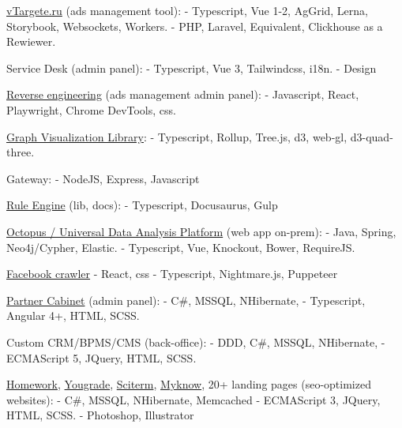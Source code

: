 \documentclass{yb}
\begin{document}
\href{https://vtargete.ru/}{vTargete.ru} (ads management tool): 
\newline - Typescript, Vue 1-2, AgGrid, Lerna, Storybook, Websockets, Workers.
\newline - PHP, Laravel, Equivalent, Clickhouse as a Rewiewer.

Service Desk (admin panel): 
\newline - Typescript, Vue 3, Tailwindcss, i18n.
\newline - Design


\href{https://vk.com/}{Reverse engineering} (ads management admin panel): 
\newline - Javascript, React, Playwright, Chrome DevTools, css.

\href{https://baltinfocom.ru/BigData\#en}{Graph Visualization Library}:
\newline - Typescript, Rollup, Tree.js, d3, web-gl, d3-quad-three.

Gateway:
\newline - NodeJS, Express, Javascript

\href{https://nikitait.github.io/nools-ts/docs/}{Rule Engine} (lib, docs):
\newline - Typescript, Docusaurus, Gulp

\href{https://baltinfocom.ru/BigData\#en}{Octopus / Universal Data Analysis Platform} (web app on-prem): 
\newline - Java, Spring, Neo4j/Cypher, Elastic.
\newline - Typescript, Vue, Knockout, Bower, RequireJS.

\href{https://github.com/NikitaIT/facebook-crawling-nightmare}{Facebook crawler}
\newline - React, css
\newline - Typescript, Nightmare.js, Puppeteer

\href{https://hmwk.ru/partner/}{Partner Cabinet} (admin panel): \newline - C\#, MSSQL, NHibernate, 
\newline - Typescript, Angular 4+, HTML, SCSS.

Custom CRM/BPMS/CMS (back-office):
\newline - DDD, C\#, MSSQL, NHibernate,
\newline - ECMAScript 5, JQuery, HTML, SCSS.

\href{https://homework.ru}{Homework}, \href{https://yougrade.ru}{Yougrade}, 
\href{http://sciterm.ru}{Sciterm},
\href{https://myknow.ru}{Myknow}, 20+ landing pages (seo-optimized websites):
\newline - C\#, MSSQL, NHibernate, Memcached
\newline - ECMAScript 3, JQuery, HTML, SCSS.
\newline - Photoshop, Illustrator
\end{document}
